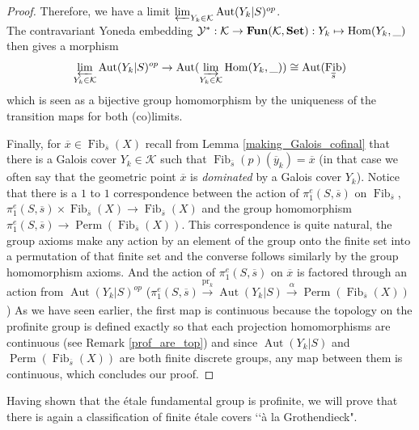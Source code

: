 \documentclass{article}
\theoremstyle{plain}
\theoremstyle{definition}
\DeclareMathOperator{\Hom}{Hom}
\DeclareMathOperator{\Fib}{Fib}
\DeclareMathOperator{\Aut}{Aut}
\DeclareMathOperator{\Perm}{Perm}
\DeclareMathOperator{\pr}{pr}
\DeclareMathOperator{\SET}{\bf{Set}}
\DeclareMathOperator{\Fun}{\bf{Fun}}
\begin{document}
\begin{proof}
    Therefore, we have a limit $\varprojlim_{Y_k\in\mathcal{K}} \Aut(Y_k|S)^{op}$.\\
    The contravariant Yoneda embedding $\mathcal{Y}^*: \mathcal{K}\rightarrow \Fun(\mathcal{K},\SET) :Y_k\mapsto \Hom(Y_k,\_)$ then gives a morphism 
    $$\varprojlim_{Y_k\in\mathcal{K}} \Aut(Y_k|S)^{op} \rightarrow \Aut(\varinjlim_{Y_k\in\mathcal{K}}\Hom(Y_k,\_))\cong \Aut(\Fib_{\overline{s}})$$
    which is seen as a bijective group homomorphism by the uniqueness of the transition maps for both (co)limits.

    \noindent Finally, for $\overline{x}\in \Fib_{\overline{s}}(X)$ recall from Lemma \ref{making_Galois_cofinal} that there is a Galois cover $Y_k\in\mathcal{K}$ such that $\Fib_{\overline{s}}(p)(\overline{y}_k)=\overline{x}$ (in that case we often say that the geometric point $\overline{x}$ is \textit{dominated} by a Galois cover $Y_k$). 
    Notice that there is a $1$ to $1$ correspondence between the action of $\pi_1^e(S,\overline{s})$ on $\Fib_{\overline{s}}$,  $\pi_1^e(S,\overline{s})\times \Fib_{\overline{s}}(X) \rightarrow\Fib_{\overline{s}}(X)$ and the group homomorphism $\pi_1^e(S,\overline{s})\rightarrow \Perm(\Fib_{\overline{s}}(X))$.
    This correspondence is quite natural, the group axioms make any action by an element of the group onto the finite set into a permutation of that finite set and the converse follows similarly by the group homomorphism axioms.
    And the action of $\pi_1^e(S,\overline{s})$ on $\overline{x}$ is factored through an action from $\Aut(Y_k|S)^{op}$ ($\pi_1^e(S,\overline{s}) \xrightarrow[]{\pr_k} \Aut(Y_k|S)\xrightarrow[]{\alpha}\Perm(\Fib_{\overline{s}}(X))$)
    As we have seen earlier, the first map is continuous because the topology on the profinite group is defined exactly so that each projection homomorphisms are continuous (see Remark \ref{prof_are_top}) and since $\Aut(Y_k|S)$ and $\Perm(\Fib_{\overline{s}}(X))$ are both finite discrete groups, any map between them is continuous, which concludes our proof.
\end{proof}



\noindent Having shown that the \'etale fundamental group is profinite, we will prove that there is again a classification of finite \'etale covers ‘‘\`a la Grothendieck".
\end{document}
